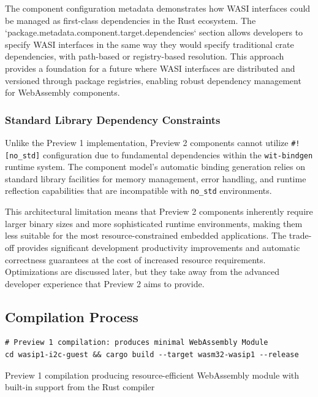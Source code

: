 The component configuration metadata demonstrates how WASI interfaces could be managed as first-class dependencies in the Rust ecosystem. The `package.metadata.component.target.dependencies` section allows developers to specify WASI interfaces in the same way they would specify traditional crate dependencies, with path-based or registry-based resolution. This approach provides a foundation for a future where WASI interfaces are distributed and versioned through package registries, enabling robust dependency management for WebAssembly components.

\subsubsection{Standard Library Dependency Constraints}

Unlike the Preview 1 implementation, Preview 2 components cannot utilize \texttt{\#![no\_std]} configuration due to fundamental dependencies within the \texttt{wit-bindgen} runtime system. The component model's automatic binding generation relies on standard library facilities for memory management, error handling, and runtime reflection capabilities that are incompatible with \texttt{no\_std} environments.

This architectural limitation means that Preview 2 components inherently require larger binary sizes and more sophisticated runtime environments, making them less suitable for the most resource-constrained embedded applications. The trade-off provides significant development productivity improvements and automatic correctness guarantees at the cost of increased resource requirements. Optimizations are discussed later, but they take away from the advanced developer experience that Preview 2 aims to provide.

\subsection{Compilation Process}

\begin{listing}[H]
\begin{verbatim}
# Preview 1 compilation: produces minimal WebAssembly Module
cd wasip1-i2c-guest && cargo build --target wasm32-wasip1 --release
\end{verbatim}
\caption{Preview 1 compilation producing resource-efficient WebAssembly module with built-in support from the Rust compiler}
\label{lst:preview1-compilation}
\end{listing}

